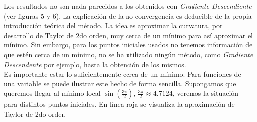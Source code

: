 \documentclass[11pt,a4paper]{article}
\theoremstyle{definition}
\begin{document}
	Los resultados no son nada parecidos a los obtenidos con \textit{Gradiente Descendiente} (ver figuras 5 y 6). La explicación de la no convergencia es deducible de la propia introducción teórica del método. La idea es aproximar la curvatura, por desarrollo de Taylor de 2do orden, \underline{muy cerca de un mínimo} para así aproximar el mínimo. Sin embargo, para los puntos iniciales usados no tenemos información de que estén cerca de un mínimo, no se ha utilizado ningún método, como \textit{Gradiente Descendente} por ejemplo, hasta la obtención de los mismos.\\
	Es importante estar lo suficientemente cerca de un mínimo. Para funciones de una variable se puede ilustrar este hecho de forma sencilla. Supongamos que queremos llegar al mínimo local $\sin(\frac{3\pi}{2})$, $\frac{3\pi}{2} \approx 4.7124$, veremos la situación para distintos puntos iniciales. En línea roja se visualiza la aproximación de Taylor de 2do orden\\ ~\\
	
\end{document}
